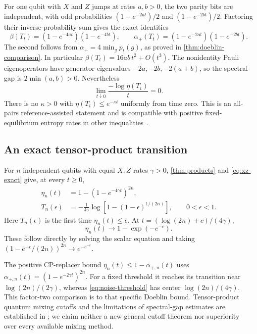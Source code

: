 \documentclass[11pt]{article}
\numberwithin{equation}{section}
\theoremstyle{definition}
\theoremstyle{remark}
\begin{document}
For one qubit with $X$ and $Z$ jumps at rates $a,b>0$, the two parity
bits are independent, with odd probabilities
$(1-e^{-2at})/2$ and $(1-e^{-2bt})/2$.
Factoring their inverse-probability sum gives the exact identities
\begin{equation}
 \beta(T_t)=(1-e^{-4at})(1-e^{-4bt}),\qquad
 \alpha_+(T_t)=(1-e^{-2at})(1-e^{-2bt}).
 \label{eq:xz-exact}
\end{equation}
The second follows from $\alpha_+=4\min_g p_t(g)$, as proved in
\cref{thm:doeblin-comparison}.
In particular $\beta(T_t)=16ab\,t^2+O(t^3)$.
The nonidentity Pauli eigenoperators have generator eigenvalues
$-2a,-2b,-2(a+b)$, so the spectral gap is $2\min(a,b)>0$.
Nevertheless
\[
 \lim_{t\downarrow0}\frac{-\log\eta(T_t)}t=0.
\]
There is no $\kappa>0$ with $\eta(T_t)\leq e^{-\kappa t}$
uniformly from time zero. This is an all-pairs reference-assisted
statement and is compatible with positive fixed-equilibrium entropy
rates in other inequalities~\cite{GR22}.

\subsection{An exact tensor-product transition}

For $n$ independent qubits with equal $X,Z$ rates $\gamma>0$,
\cref{thm:products} and \eqref{eq:xz-exact} give, at every $t\geq0$,
\begin{align}
 \eta_n(t)&=1-(1-e^{-4\gamma t})^{2n}, \label{eq:noise-cutoff}\\
 T_n(\epsilon)
 &= -\frac1{4\gamma}
       \log\!\left[1-(1-\epsilon)^{1/(2n)}\right],
 \qquad 0<\epsilon<1. \label{eq:noise-threshold}
\end{align}
Here $T_n(\epsilon)$ is the first time $\eta_n(t)\leq\epsilon$.
At $t=(\log(2n)+c)/(4\gamma)$,
\[
 \eta_n(t)\longrightarrow 1-\exp(-e^{-c}).
\]
These follow directly by solving the scalar equation and taking
$(1-e^{-c}/(2n))^{2n}\to e^{-e^{-c}}$.

The positive CP-replacer bound
$\eta_n(t)\leq1-\alpha_{+,n}(t)$ uses
$\alpha_{+,n}(t)=(1-e^{-2\gamma t})^{2n}$.
For a fixed threshold it reaches its transition near
$\log(2n)/(2\gamma)$, whereas \eqref{eq:noise-threshold} has center
$\log(2n)/(4\gamma)$. This factor-two comparison is to that specific
Doeblin bound. Tensor-product quantum mixing cutoffs and the limitations
of spectral-gap estimates are established in \cite{KRW12}; we claim
neither a new general cutoff theorem nor superiority over every
available mixing method.
\end{document}
